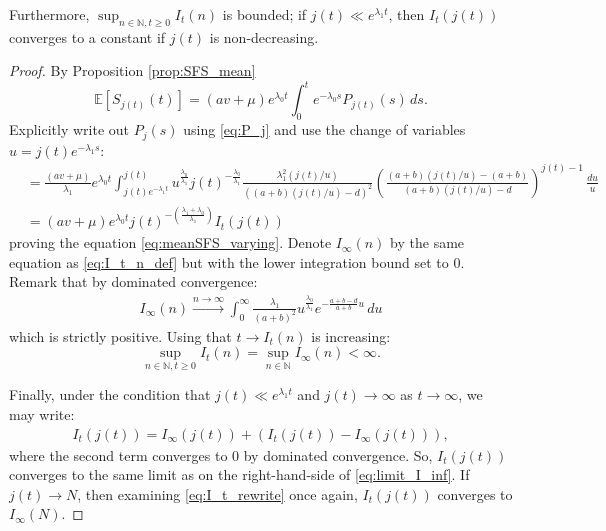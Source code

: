 \documentclass{article}
\numberwithin{equation}{section}
\begin{document}
Furthermore, $\sup_{n\in \mathbb{N},t\geq 0}I_t(n)$ is bounded; if $j(t)\ll e^{\lambda_1 t}$, then $I_t(j(t))$ converges to a constant if $j(t)$ is non-decreasing.
\begin{proof}
  By Proposition \ref{prop:SFS_mean}
    \[\mathbb{E}[S_{j(t)}(t)]=(av+\mu)e^{\lambda_0 t}\int_0^t e^{-\lambda_0 s}P_{j(t)}(s)\,ds.\]
    Explicitly write out $P_j(s)$ using \ref{eq:P_j} and use the change of variables $u=j(t)e^{-\lambda_1 s}$:
    \begin{align}
        &=\frac{(av+\mu)}{\lambda_1}e^{\lambda_0 t}\int_{j(t)e^{-\lambda_1 t}}^{j(t)}u^{\frac{\lambda_0}{\lambda_1}}j(t)^{-\frac{\lambda_0}{\lambda_1}}\frac{\lambda_1^2(j(t)/u)}{((a+b)(j(t)/u)-d)^2}\left(\frac{(a+b)(j(t)/u)-(a+b)}{(a+b)(j(t)/u)-d}\right)^{j(t)-1}\,\frac{du}{u}\nonumber\\
        &=(av+\mu)e^{\lambda_0 t}j(t)^{-\left(\frac{\lambda_1+\lambda_0}{\lambda_1}\right)}I_t(j(t))\nonumber
    \end{align}
    proving the equation \ref{eq:meanSFS_varying}. Denote $I_\infty(n)$ by the same equation as \ref{eq:I_t_n_def} but with the lower integration bound set to $0$. Remark that by dominated convergence:
    \begin{align}
        I_\infty(n)\overset{n\to\infty}{\to} \int_0^\infty \frac{\lambda_1}{(a+b)^2}u^{\frac{\lambda_0}{\lambda_1}}e^{-\frac{a+b-d}{a+b}u}\,du\label{eq:limit_I_inf}
    \end{align}
    which is strictly positive. Using that $t\to I_t(n)$ is increasing:
    \[\sup_{n\in \mathbb{N},t\geq 0}I_t(n)=\sup_{n\in \mathbb{N}}I_\infty(n)<\infty.\]

    Finally, under the condition that $j(t)\ll e^{\lambda_1 t}$ and $j(t)\to\infty$ as $t\to\infty$, we may write:
    \begin{align}
        I_t(j(t))=I_\infty(j(t))+(I_t(j(t))-I_\infty(j(t))),\label{eq:I_t_rewrite}
    \end{align}
    where the second term converges to $0$ by dominated convergence. So, $I_t(j(t))$ converges to the same limit as on the right-hand-side of \ref{eq:limit_I_inf}. If $j(t)\to N$, then examining \ref{eq:I_t_rewrite} once again, $I_t(j(t))$ converges to $I_\infty(N)$. \end{proof}
\end{document}
